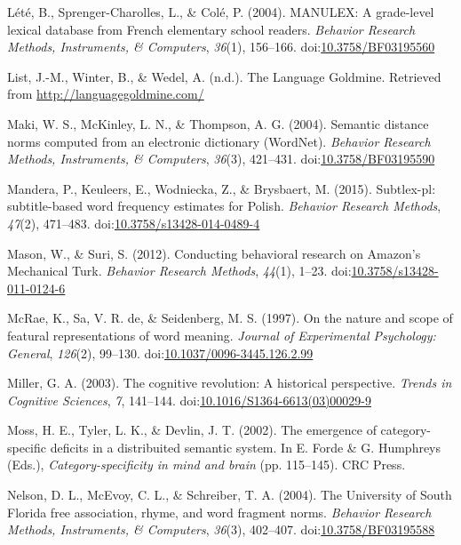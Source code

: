 \documentclass[english,,man]{apa6}
\theoremstyle{definition}
\theoremstyle{definition}
\theoremstyle{definition}
\theoremstyle{remark}
\begin{document}
\leavevmode\hypertarget{ref-Lete2004}{}%
Lété, B., Sprenger-Charolles, L., \& Colé, P. (2004). MANULEX: A
grade-level lexical database from French elementary school readers.
\emph{Behavior Research Methods, Instruments, \& Computers},
\emph{36}(1), 156--166.
doi:\href{https://doi.org/10.3758/BF03195560}{10.3758/BF03195560}

\leavevmode\hypertarget{ref-List}{}%
List, J.-M., Winter, B., \& Wedel, A. (n.d.). The Language Goldmine.
Retrieved from \url{http://languagegoldmine.com/}

\leavevmode\hypertarget{ref-Maki2004}{}%
Maki, W. S., McKinley, L. N., \& Thompson, A. G. (2004). Semantic
distance norms computed from an electronic dictionary (WordNet).
\emph{Behavior Research Methods, Instruments, \& Computers},
\emph{36}(3), 421--431.
doi:\href{https://doi.org/10.3758/BF03195590}{10.3758/BF03195590}

\leavevmode\hypertarget{ref-Mandera2015}{}%
Mandera, P., Keuleers, E., Wodniecka, Z., \& Brysbaert, M. (2015).
Subtlex-pl: subtitle-based word frequency estimates for Polish.
\emph{Behavior Research Methods}, \emph{47}(2), 471--483.
doi:\href{https://doi.org/10.3758/s13428-014-0489-4}{10.3758/s13428-014-0489-4}

\leavevmode\hypertarget{ref-Mason2012}{}%
Mason, W., \& Suri, S. (2012). Conducting behavioral research on
Amazon's Mechanical Turk. \emph{Behavior Research Methods},
\emph{44}(1), 1--23.
doi:\href{https://doi.org/10.3758/s13428-011-0124-6}{10.3758/s13428-011-0124-6}

\leavevmode\hypertarget{ref-McRae1997}{}%
McRae, K., Sa, V. R. de, \& Seidenberg, M. S. (1997). On the nature and
scope of featural representations of word meaning. \emph{Journal of
Experimental Psychology: General}, \emph{126}(2), 99--130.
doi:\href{https://doi.org/10.1037/0096-3445.126.2.99}{10.1037/0096-3445.126.2.99}

\leavevmode\hypertarget{ref-Miller2003}{}%
Miller, G. A. (2003). The cognitive revolution: A historical
perspective. \emph{Trends in Cognitive Sciences}, \emph{7}, 141--144.
doi:\href{https://doi.org/10.1016/S1364-6613(03)00029-9}{10.1016/S1364-6613(03)00029-9}

\leavevmode\hypertarget{ref-Moss2002}{}%
Moss, H. E., Tyler, L. K., \& Devlin, J. T. (2002). The emergence of
category-specific deficits in a distribuited semantic system. In E.
Forde \& G. Humphreys (Eds.), \emph{Category-specificity in mind and
brain} (pp. 115--145). CRC Press.

\leavevmode\hypertarget{ref-Nelson2004}{}%
Nelson, D. L., McEvoy, C. L., \& Schreiber, T. A. (2004). The University
of South Florida free association, rhyme, and word fragment norms.
\emph{Behavior Research Methods, Instruments, \& Computers},
\emph{36}(3), 402--407.
doi:\href{https://doi.org/10.3758/BF03195588}{10.3758/BF03195588}
\end{document}
